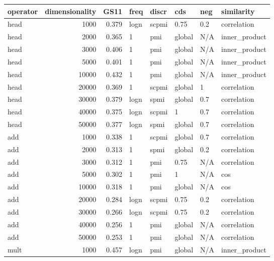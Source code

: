 \begin{tabular}{lrrlllll}
\toprule
operator &  dimensionality &   GS11 &  freq &  discr &     cds &  neg &     similarity \\
\midrule
    head &            1000 &  0.379 &  logn &  scpmi &    0.75 &  0.2 &    correlation \\
    head &            2000 &  0.365 &     1 &    pmi &  global &  N/A &  inner\_product \\
    head &            3000 &  0.406 &     1 &    pmi &  global &  N/A &  inner\_product \\
    head &            5000 &  0.401 &     1 &    pmi &  global &  N/A &  inner\_product \\
    head &           10000 &  0.432 &     1 &    pmi &  global &  N/A &  inner\_product \\
    head &           20000 &  0.369 &     1 &  scpmi &  global &    1 &    correlation \\
    head &           30000 &  0.379 &  logn &   spmi &  global &  0.7 &    correlation \\
    head &           40000 &  0.375 &  logn &  scpmi &       1 &  0.7 &    correlation \\
    head &           50000 &  0.377 &  logn &   spmi &  global &  0.7 &    correlation \\
     add &            1000 &  0.338 &     1 &  scpmi &  global &  0.7 &    correlation \\
     add &            2000 &  0.313 &     1 &   spmi &  global &  0.2 &    correlation \\
     add &            3000 &  0.312 &     1 &    pmi &    0.75 &  N/A &    correlation \\
     add &            5000 &  0.302 &     1 &    pmi &       1 &  N/A &            cos \\
     add &           10000 &  0.318 &     1 &    pmi &  global &  N/A &            cos \\
     add &           20000 &  0.284 &  logn &  scpmi &    0.75 &  0.2 &    correlation \\
     add &           30000 &  0.266 &  logn &  scpmi &    0.75 &  0.2 &    correlation \\
     add &           40000 &  0.256 &     1 &    pmi &  global &  N/A &    correlation \\
     add &           50000 &  0.253 &     1 &    pmi &  global &  N/A &    correlation \\
    mult &            1000 &  0.457 &  logn &    pmi &  global &  N/A &  inner\_product \\

\end{tabular}
